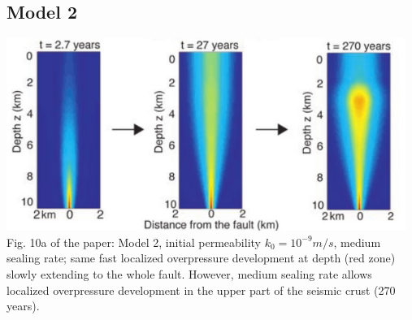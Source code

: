 \newpage
\subsection*{Model 2}

\begin{center}
\includegraphics[width=13cm]{python_codes/fieldstone_126/images/grfr03_10b}\\
{\captionfont Fig. 10a of the paper:
Model 2, initial permeability $k_0 = 10^{-9} m/s$, medium sealing rate; same fast localized
overpressure development at depth (red zone) slowly extending to the whole fault. However, 
medium sealing rate allows localized overpressure development in the upper part 
of the seismic crust (270 years). 
}
\end{center}


